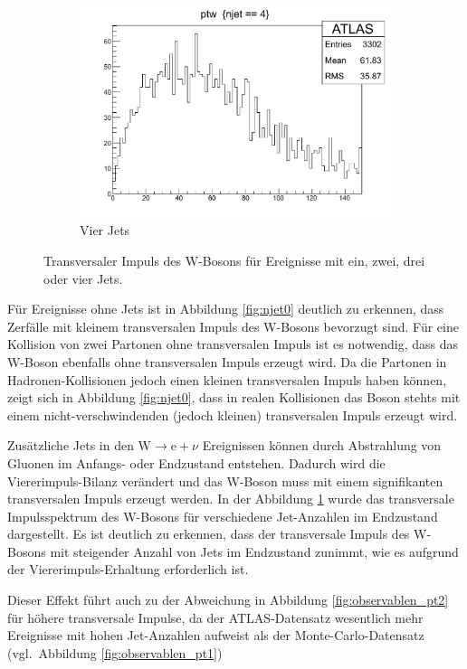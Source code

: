 \documentclass[11pt, a4paper]{article}
\numberwithin{equation}{section}
\begin{document}
\begin{figure}
\begin{subfigure}{.49\textwidth}
	\end{subfigure}
	\begin{subfigure}{.49\textwidth}
		\centering
		\includegraphics[width=.7\textwidth]{./data/root/wmass/exercise2/njet4.pdf}
		\caption{Vier Jets}
	\end{subfigure}
	\caption{Transversaler Impuls des W-Bosons für Ereignisse mit ein, zwei, drei oder vier Jets.}
	\label{fig:njet1-4}
\end{figure}

Für Ereignisse ohne Jets ist in Abbildung \ref{fig:njet0} deutlich zu erkennen, dass Zerfälle mit kleinem transversalen Impuls des W-Bosons bevorzugt sind.
Für eine Kollision von zwei Partonen ohne transversalen Impuls ist es notwendig, dass das W-Boson ebenfalls ohne transversalen Impuls erzeugt wird.
Da die Partonen in Hadronen-Kollisionen jedoch einen kleinen transversalen Impuls haben können, zeigt sich in Abbildung \ref{fig:njet0}, dass in realen Kollisionen das Boson stehts mit einem nicht-ver\-schwin\-den\-den (jedoch kleinen) transversalen Impuls erzeugt wird.

Zusätzliche Jets in den $\mathrm{W} \rightarrow \mathrm{e} + \nu$ Ereignissen können durch Abstrahlung von Gluonen im Anfangs- oder Endzustand entstehen.
Dadurch wird die Viererimpuls-Bilanz verändert und das W-Boson muss mit einem signifikanten transversalen Impuls erzeugt werden.
In der Abbildung \ref{fig:njet1-4} wurde das transversale Impulsspektrum des W-Bosons für verschiedene Jet-Anzahlen im Endzustand dargestellt.
Es ist deutlich zu erkennen, dass der transversale Impuls des W-Bosons mit steigender Anzahl von Jets im Endzustand zunimmt, wie es aufgrund der Viererimpuls-Erhaltung erforderlich ist.

Dieser Effekt führt auch zu der Abweichung in Abbildung \ref{fig:observablen_pt2} für höhere transversale Impulse, da der ATLAS-Datensatz wesentlich mehr Ereignisse mit hohen Jet-Anzahlen aufweist als der Monte-Carlo-Datensatz (vgl.\ Abbildung \ref{fig:observablen_pt1})
\end{document}

